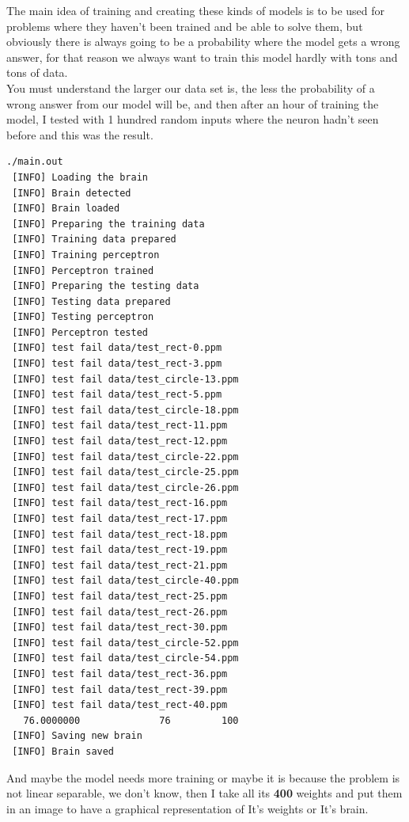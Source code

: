 \documentclass[12pt]{article}
\begin{document}
The main idea of training and creating these kinds of models is to be used for problems where they
haven't been trained and be able to solve them, but obviously there is always going to be a
probability where the model gets a wrong answer, for that reason we always want to train this model
hardly with tons and tons of data.\\

You must  understand the larger our data set is, the less the probability of a wrong answer
from our model will be, and then after an hour of training the model, I tested with 1 hundred
random inputs where the neuron hadn't seen before and this was the result.
\begin{verbatim}
./main.out
 [INFO] Loading the brain
 [INFO] Brain detected
 [INFO] Brain loaded
 [INFO] Preparing the training data
 [INFO] Training data prepared
 [INFO] Training perceptron
 [INFO] Perceptron trained
 [INFO] Preparing the testing data
 [INFO] Testing data prepared
 [INFO] Testing perceptron
 [INFO] Perceptron tested
 [INFO] test fail data/test_rect-0.ppm
 [INFO] test fail data/test_rect-3.ppm
 [INFO] test fail data/test_circle-13.ppm
 [INFO] test fail data/test_rect-5.ppm
 [INFO] test fail data/test_circle-18.ppm
 [INFO] test fail data/test_rect-11.ppm
 [INFO] test fail data/test_rect-12.ppm
 [INFO] test fail data/test_circle-22.ppm
 [INFO] test fail data/test_circle-25.ppm
 [INFO] test fail data/test_circle-26.ppm
 [INFO] test fail data/test_rect-16.ppm
 [INFO] test fail data/test_rect-17.ppm
 [INFO] test fail data/test_rect-18.ppm
 [INFO] test fail data/test_rect-19.ppm
 [INFO] test fail data/test_rect-21.ppm
 [INFO] test fail data/test_circle-40.ppm
 [INFO] test fail data/test_rect-25.ppm
 [INFO] test fail data/test_rect-26.ppm
 [INFO] test fail data/test_rect-30.ppm
 [INFO] test fail data/test_circle-52.ppm
 [INFO] test fail data/test_circle-54.ppm
 [INFO] test fail data/test_rect-36.ppm
 [INFO] test fail data/test_rect-39.ppm
 [INFO] test fail data/test_rect-40.ppm
   76.0000000              76         100
 [INFO] Saving new brain
 [INFO] Brain saved
\end{verbatim}
And maybe the model needs more training or maybe it is because the problem is not linear separable,
we don't know, then I take all its \textbf{400} weights and put them in an image to have a graphical
representation of It's weights or It's brain.
\end{document}
